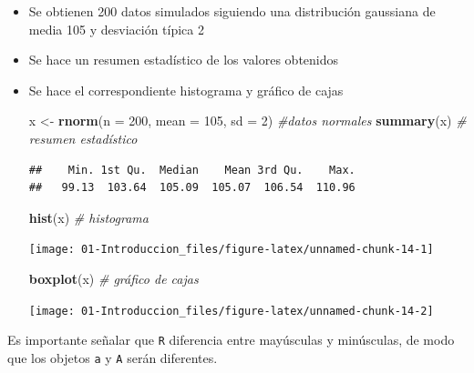 \documentclass[]{book}
\newenvironment{Shaded}{\begin{snugshade}}{\end{snugshade}}
\newcommand{\KeywordTok}[1]{\textcolor[rgb]{0.13,0.29,0.53}{\textbf{#1}}}
\newcommand{\DataTypeTok}[1]{\textcolor[rgb]{0.13,0.29,0.53}{#1}}
\newcommand{\DecValTok}[1]{\textcolor[rgb]{0.00,0.00,0.81}{#1}}
\newcommand{\StringTok}[1]{\textcolor[rgb]{0.31,0.60,0.02}{#1}}
\newcommand{\CommentTok}[1]{\textcolor[rgb]{0.56,0.35,0.01}{\textit{#1}}}
\newcommand{\NormalTok}[1]{#1}
\begin{document}
\begin{itemize}
\item
  Se obtienen 200 datos simulados siguiendo una distribución gaussiana
  de media 105 y desviación típica 2
\item
  Se hace un resumen estadístico de los valores obtenidos
\item
  Se hace el correspondiente histograma y gráfico de cajas

\begin{Shaded}
\begin{Highlighting}[]
\NormalTok{x <-}\StringTok{ }\KeywordTok{rnorm}\NormalTok{(}\DataTypeTok{n =} \DecValTok{200}\NormalTok{, }\DataTypeTok{mean =} \DecValTok{105}\NormalTok{, }\DataTypeTok{sd =} \DecValTok{2}\NormalTok{) }\CommentTok{#datos normales}
\KeywordTok{summary}\NormalTok{(x) }\CommentTok{# resumen estadístico}
\end{Highlighting}
\end{Shaded}

\begin{verbatim}
##    Min. 1st Qu.  Median    Mean 3rd Qu.    Max. 
##   99.13  103.64  105.09  105.07  106.54  110.96
\end{verbatim}

\begin{Shaded}
\begin{Highlighting}[]
\KeywordTok{hist}\NormalTok{(x) }\CommentTok{# histograma}
\end{Highlighting}
\end{Shaded}

  \begin{center}\texttt{[image: 01-Introduccion\_files/figure-latex/unnamed-chunk-14-1]} \end{center}

\begin{Shaded}
\begin{Highlighting}[]
\KeywordTok{boxplot}\NormalTok{(x) }\CommentTok{# gráfico de cajas}
\end{Highlighting}
\end{Shaded}

  \begin{center}\texttt{[image: 01-Introduccion\_files/figure-latex/unnamed-chunk-14-2]} \end{center}
\end{itemize}

Es importante señalar que \texttt{R} diferencia entre mayúsculas y
minúsculas, de modo que los objetos \texttt{a} y \texttt{A} serán
diferentes.
\end{document}
